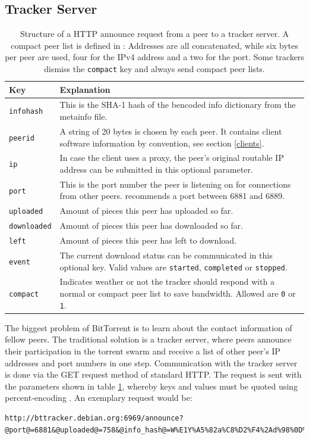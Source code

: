 \documentclass[10pt, a4paper, twoside, headsepline]{scrbook}
\renewcommand{\_}{\origunderscore\allowbreak}
\begin{document}
\subsection{Tracker Server}
\label{tracker-server}
\begin{table}
\centering
\begin{tabularx}{\textwidth}{lX}
\toprule
Key & Explanation \\
\midrule
\texttt{info\_hash} & This is the SHA-1 hash of the bencoded info dictionary from the metainfo file. \\
\texttt{peer\_id} & A string of 20 bytes is chosen by each peer. It contains client software information by convention, see section \ref{clients}. \\
\texttt{ip} & In case the client uses a proxy, the peer's original routable IP address can be submitted in this optional parameter. \\
\texttt{port} & This is the port number the peer is listening on for connections from other peers. \cite{bep3} recommends a port between 6881 and 6889. \\
\texttt{uploaded} & Amount of pieces this peer has uploaded so far. \\
\texttt{downloaded} & Amount of pieces this peer has downloaded so far. \\
\texttt{left} & Amount of pieces this peer has left to download. \\
\texttt{event} & The current download status can be communicated in this optional key. Valid values are \texttt{started}, \texttt{completed} or \texttt{stopped}. \\
\texttt{compact} & Indicates weather or not the tracker should respond with a normal or compact peer list to save bandwidth. Allowed are \texttt{0} or \texttt{1}. \\
\bottomrule
\end{tabularx}
\caption[Structure of a HTTP announce request]{Structure of a HTTP announce request from a peer to a tracker server. A compact peer list is defined in \cite{bep23}: Addresses are all concatenated, while six bytes per peer are used, four for the IPv4 address and a two for the port. Some trackers dismiss the \texttt{compact} key and always send compact peer lists.}
\label{announce}
\end{table}

The biggest problem of BitTorrent is to learn about the contact information of fellow peers. The traditional solution is a tracker server, where peers announce their participation in the torrent swarm and receive a list of other peer's IP addresses and port numbers in one step. Communication with the tracker server is done via the GET request method of standard HTTP. The request is sent with the parameters shown in table \ref{announce}, whereby keys and values must be quoted using percent-encoding \cite[§~2.1]{percent}. An exemplary request would be:
\begin{lstlisting}
http://bttracker.debian.org:6969/announce?@port@=6881&@uploaded@=758&@info_hash@=W%E1Y%A5%82a%C8%D2%F4%2Ad%98%0D%2B%80%8E9%01%FC%F6&@peer_id@=hNsfr5PYlFtWO73yvSGX&@compact@=1&@event@=started&@left@=1896&@downloaded@=1896
\end{lstlisting}
\end{document}
